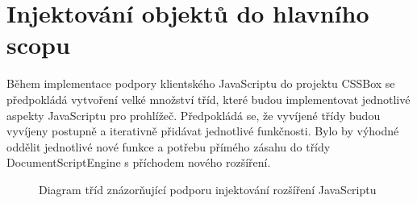 \section{Injektování objektů do hlavního scopu}
\label{Chapter.Design.GlobalScopeInjections}

Během implementace podpory klientského JavaScriptu do projektu CSSBox se předpokládá vytvoření velké množství tříd, které budou implementovat jednotlivé aspekty JavaScriptu pro prohlížeč. Předpokládá se, že vyvíjené třídy budou vyvíjeny postupně a iterativně přidávat jednotlivé funkčnosti. Bylo by výhodné oddělit jednotlivé nové funkce a potřebu přímého zásahu do třídy DocumentScriptEngine s příchodem nového rozšíření. 

\begin{figure}[H]
  \begin{center}
    \caption{Diagram tříd znázorňující podporu injektování rozšíření JavaScriptu}
    \label{Figure.GlobalScopeInjectionsDesign}
  \end{center}
\end{figure}

